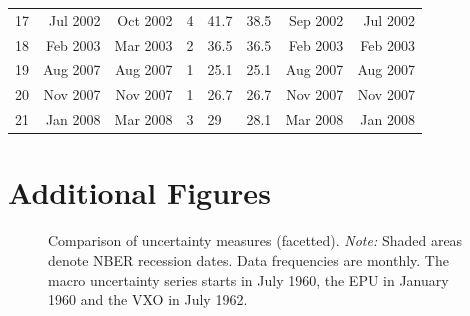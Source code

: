 \documentclass[a4paper,11pt,listof=nochaptergap,oneside,pointednumbers,bibtotoc,bigheadings,liststotoc]{scrbook}
\theoremstyle{mysatz}
\theoremstyle{mydefinition}
\theoremstyle{mytheorem}
\theoremstyle{mybemerkung}
\begin{document}
\begin{spacing}{.9}
\begin{landscape}
\begin{longtable}{rrrrllrr}
        17 & Jul 2002 & Oct 2002 & 4 & 41.7 & 38.5 & Sep 2002 & Jul 2002 \\
        18 & Feb 2003 & Mar 2003 & 2 & 36.5 & 36.5 & Feb 2003 & Feb 2003 \\
        19 & Aug 2007 & Aug 2007 & 1 & 25.1 & 25.1 & Aug 2007 & Aug 2007 \\
        20 & Nov 2007 & Nov 2007 & 1 & 26.7 & 26.7 & Nov 2007 & Nov 2007 \\
        21 & Jan 2008 & Mar 2008 & 3 & 29 & 28.1 & Mar 2008 & Jan 2008 \\
\bottomrule
        \end{longtable}
\end{landscape}
\label{tab:bloom_shocks}
\end{spacing}


\section{Additional Figures}
\label{sec:additionalFigures}
\begin{figure}[!ht]
   \centering
   \setlength\fboxsep{0pt}
   \setlength\fboxrule{0pt}
      \caption[Comparison of uncertainty measures.]{Comparison of uncertainty measures (facetted).
      \textit{Note:} Shaded areas denote NBER recession dates. Data frequencies are monthly. The macro uncertainty series starts in July 1960, the EPU in January 1960 and the VXO in July 1962.}   \label{fig:comparison_plot_combined}
\end{figure}
\end{document}
